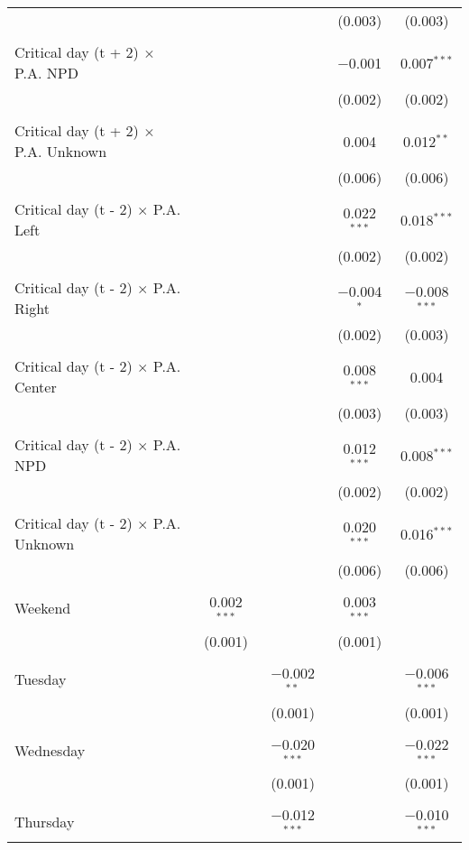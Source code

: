 \documentclass[
]{article}
\begin{document}
\begin{table}[!htbp]
{\begin{tabular}{@{\extracolsep{5pt}}lcccc}
  &  &  & (0.003) & (0.003) \\ 
  & & & & \\ 
 Critical day (t + 2) $\times$ P.A. NPD &  &  & $-$0.001 & 0.007$^{***}$ \\ 
  &  &  & (0.002) & (0.002) \\ 
  & & & & \\ 
 Critical day (t + 2) $\times$ P.A. Unknown &  &  & 0.004 & 0.012$^{**}$ \\ 
  &  &  & (0.006) & (0.006) \\ 
  & & & & \\ 
 Critical day (t - 2) $\times$ P.A. Left &  &  & 0.022$^{***}$ & 0.018$^{***}$ \\ 
  &  &  & (0.002) & (0.002) \\ 
  & & & & \\ 
 Critical day (t - 2) $\times$ P.A. Right &  &  & $-$0.004$^{*}$ & $-$0.008$^{***}$ \\ 
  &  &  & (0.002) & (0.003) \\ 
  & & & & \\ 
 Critical day (t - 2) $\times$ P.A. Center &  &  & 0.008$^{***}$ & 0.004 \\ 
  &  &  & (0.003) & (0.003) \\ 
  & & & & \\ 
 Critical day (t - 2) $\times$ P.A. NPD &  &  & 0.012$^{***}$ & 0.008$^{***}$ \\ 
  &  &  & (0.002) & (0.002) \\ 
  & & & & \\ 
 Critical day (t - 2) $\times$ P.A. Unknown &  &  & 0.020$^{***}$ & 0.016$^{***}$ \\ 
  &  &  & (0.006) & (0.006) \\ 
  & & & & \\ 
 Weekend & 0.002$^{***}$ &  & 0.003$^{***}$ &  \\ 
  & (0.001) &  & (0.001) &  \\ 
  & & & & \\ 
 Tuesday &  & $-$0.002$^{**}$ &  & $-$0.006$^{***}$ \\ 
  &  & (0.001) &  & (0.001) \\ 
  & & & & \\ 
 Wednesday &  & $-$0.020$^{***}$ &  & $-$0.022$^{***}$ \\ 
  &  & (0.001) &  & (0.001) \\ 
  & & & & \\ 
 Thursday &  & $-$0.012$^{***}$ &  & $-$0.010$^{***}$ \\ 

\end{tabular}}
\end{table}
\end{document}
